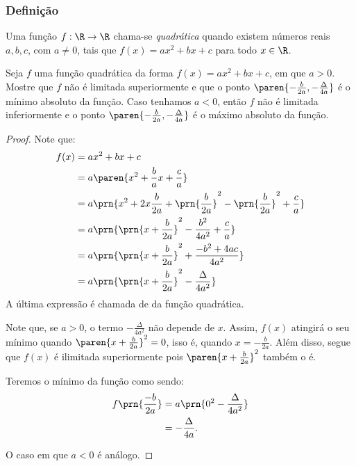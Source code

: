 \subsubsection{Definição}

\begin{definition}
Uma função $f: \R \to \R$ chama-se \emph{quadrática} quando existem
números reais $a, b, c$, com $a \neq 0$, tais que $f(x) = ax^2 +bx
+c$ para todo $x \in \R$.
\end{definition}

\begin{proposition}
Seja $f$ uma função quadrática da forma $f(x) = ax^2 + bx +c$, em que
$a >0$. Mostre que $f$ não é limitada superiormente e que o ponto
$\paren{-\frac {b} {2a}, -\frac {\Delta} {4a}}$ é o mínimo absoluto
da função. Caso tenhamos $a<0$, então $f$ não é limitada inferiormente e  o
ponto $\paren{-\frac {b} {2a}, -\frac {\Delta} {4a}}$ é o máximo
absoluto da função.
\end{proposition}

\begin{proof}
    Note que:
    \begin{align*}
        f(x) &= ax^2+bx+c\\
        &= a\paren{x^2 + \frac b a x + \frac c a} \\
        &= a\prn{x^2+2x\frac b {2a} + \prn{\frac b {2a}}^2  - \prn{\frac b {2a}}^2 + \frac c a} \\
        &= a\prn{\prn{x+\frac{b}{2a}}^2 - \frac{b^2}{4a^2}+\frac c a}\\
        &= a\prn{\prn{x+\frac{b}{2a}}^2 + \frac{-b^2+4ac}{4a^2}} \\
        &= a\prn{\prn{x+\frac{b}{2a}}^2 - \frac{\Delta}{4a^2}} \\
    \end{align*}
    \noindent A última expressão é chamada de  da função quadrática.

    Note que, se $a>0$, o termo $-\frac{\Delta}{4a^2}$ não depende de $x$. 
    Assim, $f(x)$ atingirá o seu mínimo quando $\paren{x+\frac b {2a}}^2=0$, isso é, quando
    $x = -\frac b {2a}$. 
    Além disso, segue que $f(x)$ é ilimitada superiormente pois $\paren{x+\frac{b}{2a}}^2$ também o é.

    Teremos o mínimo da função como sendo:
    \begin{align*}
        f\prn{\frac{-b}{2a}} &= a\prn{0^2-\frac{\Delta}{4a^2}} \\ &= -\frac{\Delta}{4a}.
    \end{align*}

    O caso em que $a<0$ é análogo.
\end{proof}


